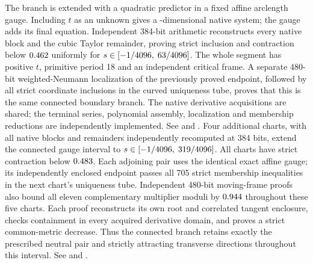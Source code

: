 \documentclass[11pt,letterpaper]{article}
\begin{document}
The branch is extended with a quadratic predictor in a fixed affine arclength gauge. Including
$t$ as an unknown gives a \nPALUnknowns-dimensional native system; the gauge adds its final equation.
Independent 384-bit arithmetic reconstructs every native block and the cubic Taylor remainder,
proving strict inclusion and contraction below $0.462$ uniformly for
$s\in[-1/4096,\;63/4096]$. The whole segment has positive $t$, primitive period 18 and an independent
critical frame. A separate 480-bit weighted-Neumann localization of the previously proved endpoint,
followed by all \nPALUnknowns{} strict coordinate inclusions in the curved uniqueness tube,
proves that this is the same connected boundary branch. The native derivative acquisitions are
shared; the terminal series, polynomial assembly, localization and membership reductions are
independently implemented. See  and
.
Four additional charts, with all native blocks and remainders independently recomputed at 384 bits,
extend the connected gauge interval to $s\in[-1/4096,\;319/4096]$.
All \nPALCharts{} charts have strict contraction below $0.483$.
Each adjoining pair uses the identical exact affine gauge; its independently enclosed endpoint
passes all 705 strict membership inequalities in the next chart's uniqueness tube.
Independent 480-bit moving-frame proofs also bound all eleven complementary multiplier moduli
by $0.944$ throughout these five charts. Each proof reconstructs its own root
and correlated tangent enclosure, checks containment in every acquired derivative domain, and
proves a strict common-metric decrease. Thus the connected branch retains exactly the prescribed
neutral pair and strictly attracting transverse directions throughout this interval. See
 and
.
\end{document}
